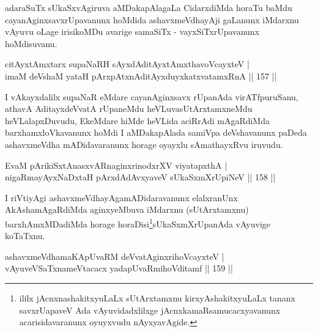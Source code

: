 \begin{artha}
adaraSuTx sUkaSxvAgiruva aMDakapAlagaLa CidarxdiMda horaTu baMdu cayanAginxsavxrUpavanunx hoMdida ashavxmeVdhayAji gaLanunx iMdarxnu vAyuvu oLage irisikoMDu avarige samaSiTx - vayxSiTxrUpavanunx hoMdisuvanu.
\end{artha}


\begin{shl}
citAyxtAmx\s tarx supaNaRH sAyxdAditAyxtAmx\s thavoVcayxteV |\\
imaM deVshaM yataH pArxpAtxnAditAyxduyxkatxvatamxRnA \hfill || 157 ||
\end{shl}

\begin{artha}
I vAkayxdalilx supaNaR eMdare cayanAginxsavx rUpanAda virATfpuruSanu, athavA AditayxdeVvatA rUpaneMdu heVLuvasUtArxtamxneMdu heVLalapxDuvudu, EkeMdare hiMde heVLida aciRrAdi mAgaRdiMda barxhamxloVkavanunx hoMdi I aMDakapAlada samiVpa deVshavanunx paDeda ashavxmeVdha mADidavaranunx horage oyayxlu sAmathayxRvu iruvudu.
\end{artha}

\begin{shl}
\footnotemark{}EvaM pArikiSxtAnasxvARnaginxrinodxrXV viyatapxthA |\\
nigaRmayAyxNaDxtaH pArxdAdAvxyaveV sUkaSxmXrUpiNeV \hfill || 158 ||
\end{shl}

\begin{artha}
I riVtiyAgi ashavxmeVdhayAgamADidaravanunx elalxranUnx AkAshamAgaRdiMda aginxyeMbuva iMdarxnu (sUtArxtamxnu) barxhAmxMDadiMda horage horaDisi\footnote{ililx jAcnxnashakitxyuLaLx sUtArxtamxnu kirxyAshakitxyuLaLx tananx savxrUapaveV Ada vAyuvidadxlilxge jAcnxkamaRsamucacxyavanunx acarisidavaranunx oyuyxvudu nAyxyavAgide.}sUkaSxmXrUpanAda vAyuvige koTaTxnu.
\end{artha}


\begin{shl}
ashavxmeVdhamaKApUvaRM deVvatA\s ginxrihoVcayxteV |\\
vAyuveVSaTxnameVtacacx yadapUvaRmihoVditamf \hfill || 159 ||
\end{shl}

